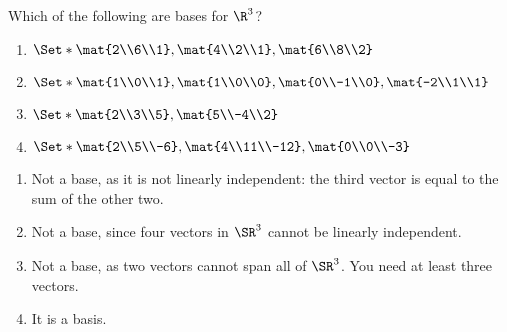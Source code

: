 \begin{exercises}
\begin{problist}
		\prob Which of the following are bases for $\R^3$?
		\begin{enumerate}
			\item $\Set*{\mat{2\\6\\1}, \mat{4\\2\\1}, \mat{6\\8\\2}}$
			\item $\Set*{\mat{1\\0\\1}, \mat{1\\0\\0}, \mat{0\\-1\\0}, \mat{-2\\1\\1}}$
			\item $\Set*{\mat{2\\3\\5}, \mat{5\\-4\\2}}$
			\item $\Set*{\mat{2\\5\\-6}, \mat{4\\11\\-12}, \mat{0\\0\\-3}}$
		\end{enumerate}
		\begin{solution}
			\begin{enumerate}
				\item Not a base, as it is not linearly independent: the third vector is equal to the sum of the other two.

				\item Not a base, since four vectors in $\SR^3$ cannot be linearly independent.

				\item Not a base, as two vectors cannot span all of $\SR^3$. You need at least three vectors.

				\item It is a basis.
			\end{enumerate}
		\end{solution}



\end{problist}
\end{exercises}
